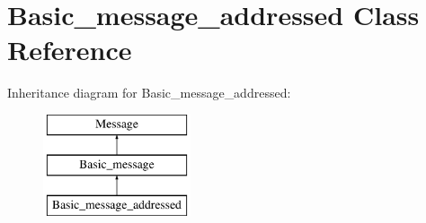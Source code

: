 \hypertarget{class_basic__message__addressed}{}\section{Basic\+\_\+message\+\_\+addressed Class Reference}
\label{class_basic__message__addressed}
Inheritance diagram for Basic\+\_\+message\+\_\+addressed\+:\begin{figure}[H]
\begin{center}
\leavevmode
\includegraphics[height=3.000000cm]{class_basic__message__addressed}
\end{center}
\end{figure}
